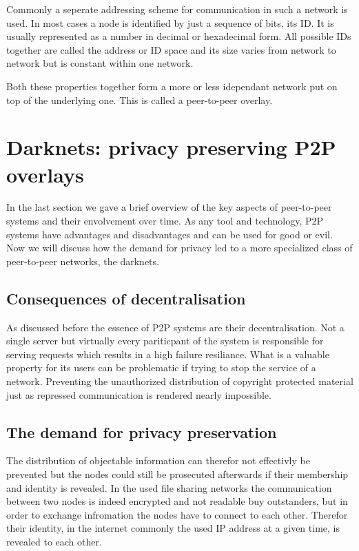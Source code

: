 Commonly a seperate addressing scheme for communication in such a network is used. In most cases a node is identified by just a sequence of bits, its ID. It is usually represented as a number in decimal or hexadecimal form. All possible IDs together are called the address or ID space and its size varies from network to network but is constant within one network.

Both these properties together form a more or less idependant network put on top of the underlying one. This is called a peer-to-peer overlay.


\section{Darknets: privacy preserving P2P overlays}

In the last section we gave a brief overview of the key aspects of peer-to-peer systems and their envolvement over time. As any tool and technology, P2P systems have advantages and disadvantages and can be used for good or evil. Now we will discuss how the demand for privacy led to a more specialized class of peer-to-peer networks, the darknets.

\subsection{Consequences of decentralisation}

As discussed before the essence of P2P systems are their decentralisation. Not a single server but virtually every pariticpant of the system is responsible for serving requests which results in a high failure resiliance. What is a valuable property for its users can be problematic if trying to stop the service of a network. Preventing the unauthorized distribution of copyright protected material just as repressed communication is rendered nearly impossible. 

\subsection{The demand for privacy preservation}

The distribution of objectable information can therefor not effectivly be prevented but the nodes could still be prosecuted afterwards if their membership and identity is revealed. In the used file sharing networks the communication between two nodes is indeed encrypted and not readable buy outstanders, but in order to exchange infromation the nodes have to connect to each other. Therefor their identity, in the internet commonly the used IP address at a given time, is revealed to each other.

